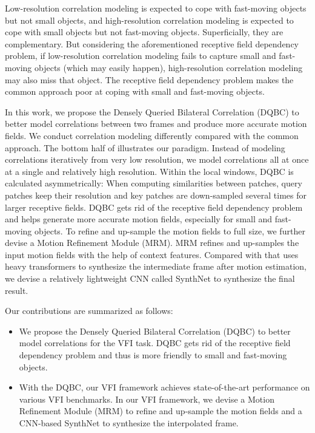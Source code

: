 \documentclass{article}
\begin{document}
Low-resolution correlation modeling is expected to cope with fast-moving objects but not small objects, and high-resolution correlation modeling is expected to cope with small objects but not fast-moving objects. Superficially, they are complementary. But considering the aforementioned receptive field dependency problem, if low-resolution correlation modeling fails to capture small and fast-moving objects (which may easily happen), high-resolution correlation modeling may also miss that object. The receptive field dependency problem makes the common approach poor at coping with small and fast-moving objects.

In this work, we propose the Densely Queried Bilateral Correlation (DQBC) to better model correlations between two frames and produce more accurate motion fields. We conduct correlation modeling differently compared with the common approach. The bottom half of  illustrates our paradigm. Instead of modeling correlations iteratively from very low resolution, we model correlations all at once at a single and relatively high resolution. Within the local windows, DQBC is calculated asymmetrically: When computing similarities between patches, query patches keep their resolution and key patches are down-sampled several times for larger receptive fields. DQBC gets rid of the receptive field dependency problem and helps generate more accurate motion fields, especially for small and fast-moving objects. To refine and up-sample the motion fields to full size, we further devise a Motion Refinement Module (MRM). MRM refines and up-samples the input motion fields with the help of context features. Compared with \cite{vfiformer} that uses heavy transformers to synthesize the intermediate frame after motion estimation, we devise a relatively lightweight CNN called SynthNet to synthesize the final result. 

Our contributions are summarized as follows:
\begin{itemize}
    \item We propose the Densely Queried Bilateral Correlation (DQBC) to better model correlations for the VFI task. DQBC gets rid of the receptive field dependency problem and thus is more friendly to small and fast-moving objects.
    \item With the DQBC, our VFI framework achieves state-of-the-art performance on various VFI benchmarks. In our VFI framework, we devise a Motion Refinement Module (MRM) to refine and up-sample the motion fields and a CNN-based SynthNet to synthesize the interpolated frame. 
\end{itemize}
\end{document}
